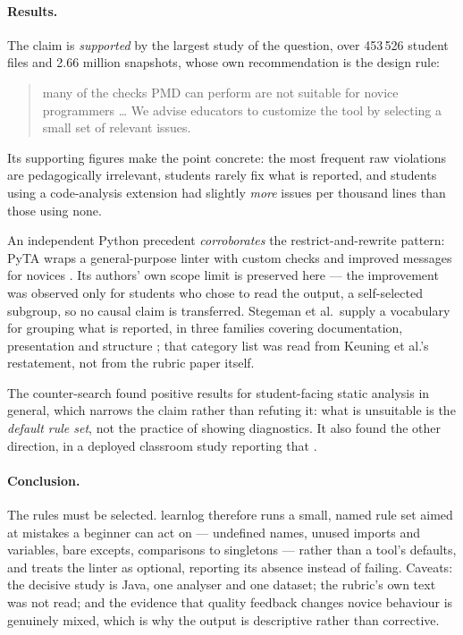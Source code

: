 \paragraph{Results.}
The claim is \emph{supported} by the largest study of the question, over
453\,526 student files and 2.66 million snapshots, whose own recommendation
is the design rule:
\blockcquote{Keuning2017}{many of the checks PMD can perform are not
suitable for novice programmers \ldots{} We advise educators to customize the
tool by selecting a small set of relevant issues.}
Its supporting figures make the point concrete: the most frequent raw
violations are pedagogically irrelevant, students rarely fix what is
reported, and students using a code-analysis extension had slightly
\emph{more} issues per thousand lines than those using none.

An independent Python precedent \emph{corroborates} the restrict-and-rewrite
pattern: PyTA wraps a general-purpose linter with custom checks and improved
messages for novices \autocite{LiuPetersen2019}.  Its authors' own scope
limit is preserved here --- the improvement was observed only for students
who chose to read the output, a self-selected subgroup, so no causal claim
is transferred.  Stegeman et al.\ supply a vocabulary for grouping what is
reported, in three families covering documentation, presentation and
structure \autocite{Stegeman2016}; that category list was read from Keuning
et al.'s restatement, not from the rubric paper itself.

The counter-search found positive results for student-facing static analysis
in general, which narrows the claim rather than refuting it: what is
unsuitable is the \emph{default rule set}, not the practice of showing
diagnostics.  It also found the other direction, in a deployed classroom
study reporting that
.

\paragraph{Conclusion.}
The rules must be selected.  learnlog therefore runs a small, named rule set
aimed at mistakes a beginner can act on --- undefined names, unused imports
and variables, bare excepts, comparisons to singletons --- rather than a
tool's defaults, and treats the linter as optional, reporting its absence
instead of failing.  Caveats: the decisive study is Java, one analyser and
one dataset; the rubric's own text was not read; and the evidence that
quality feedback changes novice behaviour is genuinely mixed, which is why
the output is descriptive rather than corrective.

